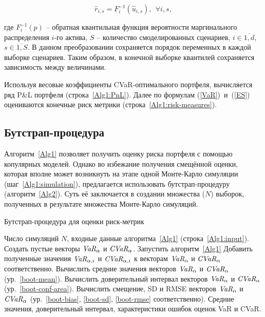 \begin{equation} \label{pobs-to-qtile}
    \hat{r}_{i,s} = F^{-1}_i (\hat{u}_{i,s}), \ \
    \forall i, s,
\end{equation}

\noindent где $F^{-1}_i (p)$ -- обратная квантильная функция вероятности маргинального распределения $i$-го актива, $S$ -- количество смоделированных сценариев, $i \in \overline{1,d}$, $s \in \overline{1,S}$.
В данном преобразовании сохраняется порядок переменных в каждой выборке сценариев.
Таким образом, в конечной выборке квантилей сохраняется зависимость между величинами.

Используя весовые коэффициенты CVaR-оптимального портфеля, вычисляется ряд P\&L портфеля (строка~\ref{Alg1:PnL}). Далее по формулам (\ref{VaR})~и~(\ref{ES}) оцениваются конечные риск метрики (строка~\ref{Alg1:risk-measures}).

\subsection{Бутстрап-процедура}
\label{methodology:bootstrap}

Алгоритм~\ref{Alg1} позволяет получить оценку риска портфеля с помощью копулярных моделей. 
Однако во избежание получения смещённой оценки, которая вполне может возникнуть на этапе одной Монте-Карло симуляции (шаг~\ref{Alg1:simulation}), предлагается использовать бутстрап-процедуру (алгоритм~\ref{Alg2}).
Суть её заключается в создании множества ($N$) выборок, полученных в результате множества Монте-Карло симуляций.

\begin{algorithm}[t]
\caption{Бутстрап-процедура для оценки риск-метрик}
\label{Alg2}
\begin{algorithmic}[1]
	\Require Число симуляций $N$, входные данные алгоритма~\ref{Alg1} (строка~\ref{Alg1:input}).
	\State Создать пустые векторы $\emph{VaR}_\alpha$ и $\emph{CVaR}_\alpha$.
	\For {$i \in \overline{1,N}$}
	    \State Запустить алгоритм~\ref{Alg1}
	    \State Добавить полученные значения $\emph{VaR}_{\alpha, i}$ и $\emph{CVaR}_{\alpha, i}$ к векторам $\emph{VaR}_\alpha$ и $\emph{CVaR}_\alpha$ соответственно.
	\EndFor
	\State Вычислить средние значения векторов $\emph{VaR}_\alpha$ и $\emph{CVaR}_\alpha$ (ур.~\ref{boot-mean}).
	\State Вычислить доверительный интервал векторов $\emph{VaR}_\alpha$ и $\emph{CVaR}_\alpha$ (ур.~\ref{boot-conf-area}).
	\State Вычислить смещение, SD и RMSE векторов $\emph{VaR}_\alpha$ и $\emph{CVaR}_\alpha$ (ур.~\ref{boot-bias}, \ref{boot-sd}, \ref{boot-rmse} соответственно).
	\Ensure Средние значения, доверительный интервал, характеристики ошибок оценок VaR и CVaR.
\end{algorithmic}
\end{algorithm}

